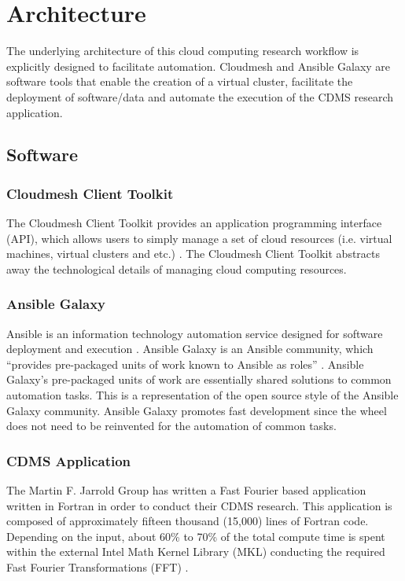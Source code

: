 \documentclass[9pt,twocolumn,twoside]{../../styles/osajnl}
\begin{document}
\section{Architecture} \label{architecture}
The underlying architecture of this cloud computing research workflow
is explicitly designed to facilitate automation. Cloudmesh and Ansible
Galaxy are software tools that enable the creation of a virtual
cluster, facilitate the deployment of software/data and automate the
execution of the CDMS research application.

\subsection{Software} \label{software}
\subsubsection{Cloudmesh Client Toolkit} 
The Cloudmesh Client Toolkit provides an application programming
interface (API), which allows users to simply manage a set of cloud
resources (i.e. virtual machines, virtual clusters and etc.)
\cite{www-cloudmesh}. The Cloudmesh Client Toolkit abstracts away the
technological details of managing cloud computing resources.

\subsubsection{Ansible Galaxy} 
Ansible is an information technology automation service designed for
software deployment and execution \cite{www-ansible}.  Ansible Galaxy
is an Ansible community, which ``provides pre-packaged units of work
known to Ansible as roles'' \cite{www-ansible-galaxy}. Ansible
Galaxy's pre-packaged units of work are essentially shared solutions
to common automation tasks. This is a representation of the open
source style of the Ansible Galaxy community. Ansible Galaxy promotes
fast development since the wheel does not need to be reinvented for
the automation of common tasks.

\subsubsection{CDMS Application} \label{cdms-app}
The Martin F. Jarrold Group has written a Fast Fourier based
application written in Fortran in order to conduct their CDMS
research. This application is composed of approximately fifteen
thousand (15,000) lines of Fortran code. Depending on the input, about
60\% to 70\% of the total compute time is spent within the external
Intel Math Kernel Library (MKL) conducting the required Fast Fourier
Transformations (FFT) \cite{www-intel-mkl}.
\end{document}
